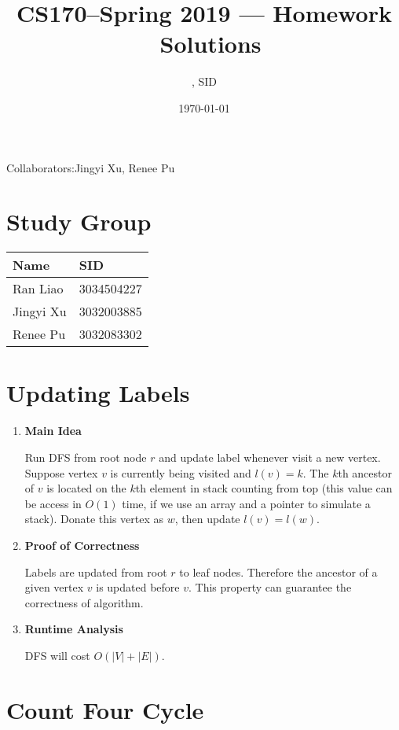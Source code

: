 \documentclass[11pt]{article}
\title{CS170--Spring 2019 --- Homework \Homework\ Solutions}
\author{\Name, SID \SID}
\date{\today}
\newenvironment{qparts}{\begin{enumerate}[{(}a{)}]}{\end{enumerate}}
\begin{document}
\maketitle
Collaborators:Jingyi Xu, Renee Pu

\section{Study Group}
	\begin{tabular}{ll}
		Name		&   SID         		\\\hline
		Ran Liao		&   3034504227  	\\  
		Jingyi Xu		&   3032003885  	\\
		Renee Pu		&   3032083302  	\\
	\end{tabular}



\newpage
\section{Updating Labels}

\begin{qparts}
	\item \textbf{Main Idea}

	Run DFS from root node $r$ and update label whenever visit a new vertex. Suppose vertex $v$ is currently being visited and $l(v) = k$. The $k$th ancestor of $v$ is located on the $k$th element in stack counting from top (this value can be access in $O(1)$ time, if we use an array and a pointer to simulate a stack). Donate this vertex as $w$, then update $l(v) = l(w)$.
	
	\item \textbf{Proof of Correctness}
	
	Labels are updated from root $r$ to leaf nodes. Therefore the ancestor of a given vertex $v$ is updated before $v$. This property can guarantee the correctness of algorithm.
	

	\item \textbf{Runtime Analysis}
	
	DFS will cost $O(|V| + |E|)$.
	

\end{qparts}

\newpage
\section{Count Four Cycle}
\end{document}

